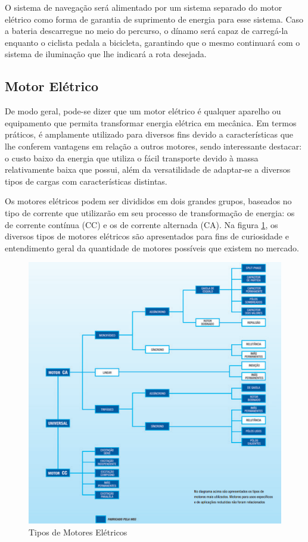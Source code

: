 	O sistema de navegação será alimentado por um sistema separado do motor elétrico como forma de garantia de suprimento de energia para esse sistema. Caso a bateria descarregue no meio do percurso, o dínamo será capaz de carregá-la enquanto o ciclista pedala a bicicleta, garantindo que o mesmo continuará com o sistema de iluminação que lhe indicará a rota desejada.
	
	\subsection{Motor Elétrico}
De modo geral, pode-se dizer que um motor elétrico é qualquer aparelho ou equipamento que permita transformar energia elétrica em mecânica. Em termos práticos, é amplamente utilizado para diversos fins devido a características que lhe conferem vantagens em relação a outros motores, sendo interessante destacar: o custo baixo da energia que utiliza o fácil transporte devido à massa relativamente baixa que possui, além da versatilidade de adaptar-se a diversos tipos de cargas com características distintas.

Os motores elétricos podem ser divididos em dois grandes grupos, baseados no tipo de corrente que utilizarão em seu processo de transformação de energia: os de corrente contínua (CC) e os de corrente alternada (CA). Na figura \ref{img:tipos_motores}, os diversos tipos de motores elétricos são apresentados para fins de curiosidade e entendimento geral da quantidade de motores possíveis que existem no mercado.	

\graphicspath{{figuras/}}
\begin{figure}[H]
\centering
\includegraphics[width=\textwidth]{tipos_motores.png}
\caption{Tipos de Motores Elétricos}
\label{img:tipos_motores}
\end{figure}

